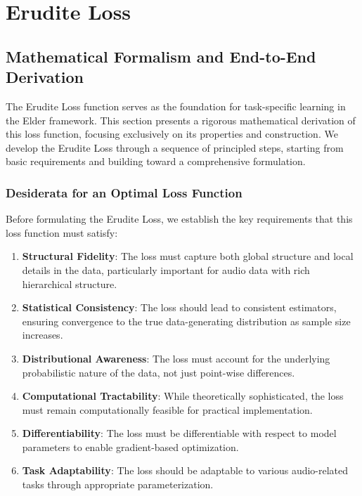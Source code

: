 \section{Erudite Loss}

\subsection{Mathematical Formalism and End-to-End Derivation}

The Erudite Loss function serves as the foundation for task-specific learning in the Elder framework. This section presents a rigorous mathematical derivation of this loss function, focusing exclusively on its properties and construction. We develop the Erudite Loss through a sequence of principled steps, starting from basic requirements and building toward a comprehensive formulation.

\subsubsection{Desiderata for an Optimal Loss Function}

Before formulating the Erudite Loss, we establish the key requirements that this loss function must satisfy:

\begin{enumerate}
\item \textbf{Structural Fidelity}: The loss must capture both global structure and local details in the data, particularly important for audio data with rich hierarchical structure.

\item \textbf{Statistical Consistency}: The loss should lead to consistent estimators, ensuring convergence to the true data-generating distribution as sample size increases.

\item \textbf{Distributional Awareness}: The loss must account for the underlying probabilistic nature of the data, not just point-wise differences.

\item \textbf{Computational Tractability}: While theoretically sophisticated, the loss must remain computationally feasible for practical implementation.

\item \textbf{Differentiability}: The loss must be differentiable with respect to model parameters to enable gradient-based optimization.

\item \textbf{Task Adaptability}: The loss should be adaptable to various audio-related tasks through appropriate parameterization.
\end{enumerate}

